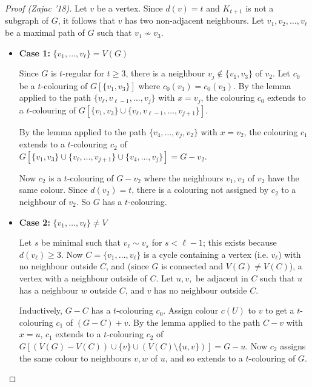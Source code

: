 \documentclass[main.tex]{subfiles}
\begin{document}
\begin{proof}[Proof (Zajac '18)]
  Let $v$ be a vertex.
  Since $d(v) = t$ and $K_{t+1}$ is not a subgraph of $G$, it follows that $v$
  has two non-adjacent neighbours.
  Let $v_1, v_2, \ldots, v_\ell$ be a maximal path of $G$ such that
  $v_1\not\sim v_3$.

  \begin{itemize}
    \item \textbf{Case 1:} $\{v_1,\ldots,v_\ell\} = V(G)$

      Since $G$ is $t$-regular for $t\geq 3$, there is a neighbour
      $v_j\notin\{v_1,v_3\}$ of $v_2$.
      Let $c_0$ be a $t$-colouring of $G[\{v_1,v_3\}]$ where $c_0(v_1) = c_0(v_3)$.
      By the lemma applied to the path $\{v_\ell, v_{\ell-1},\ldots,v_j\}$ with
      $x = v_j$, the colouring $c_0$ extends to a $t$-colouring of
      $G[\{v_1,v_3\}\cup\{v_\ell, v_{\ell-1},\ldots,v_{j+1}\}]$.

      By the lemma applied to the path $\{v_4, \ldots, v_j, v_2\}$ with $x = v_2$,
      the colouring $c_1$ extends to a $t$-colouring $c_2$ of
      $G[\{v_1,v_3\}\cup\{v_\ell,\ldots,v_{j+1}\}\cup\{v_4,\ldots,v_j\}] = G - v_2$.

      Now $c_2$ is a $t$-colouring of $G - v_2$ where the neighbours $v_1,v_3$
      of $v_2$ have the same colour.
      Since $d(v_2) = t$, there is a colouring not assigned by $c_2$ to a
      neighbour of $v_2$.
      So $G$ has a $t$-colouring.

    \item \textbf{Case 2:} $\{v_1,\ldots,v_\ell\}\neq V$

      Let $s$ be minimal such that $v_\ell\sim v_s$ for $s < \ell - 1$;
      this exists because $d(v_\ell)\geq 3$.
      Now $C = \{v_1,\ldots,v_\ell\}$ is a cycle containing a vertex (i.e. $v_\ell$)
      with no neighbour outside $C$, and (since $G$ is connected and $V(G)\neq V(C)$),
      a vertex with a neighbour outside of $C$.
      Let $u,v,$ be adjacent in $C$ such that
      $u$ has a neighbour $w$ outside $C$, and $v$ has no neighbour outside $C$.

      Inductively, $G - C$ has a $t$-colouring $c_0$.
      Assign colour $c(U)$ to $v$ to get a $t$-colouring $c_1$ of $(G - C) + v$.
      By the lemma applied to the path $C - v$ with $x = u$,
      $c_1$ extends to a $t$-colouring $c_2$ of
      $G[(V(G) - V(C))\cup\{v\}\cup(V(C)\setminus\{u,v\})] = G - u$.
      Now $c_2$ assigns the same colour to neighbours $v,w$ of $u$,
      and so extends to a $t$-colouring of $G$. \qedhere
  \end{itemize}
\end{proof}
\end{document}
